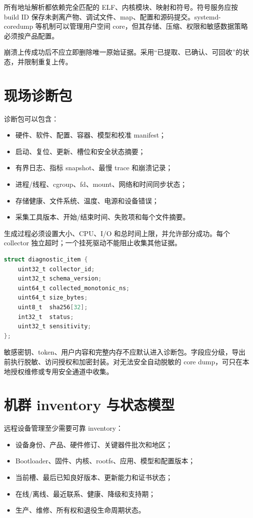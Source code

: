 所有地址解析都依赖完全匹配的 ELF、内核模块、映射和符号。符号服务应按 build ID 保存未剥离产物、调试文件、map、配置和源码提交。systemd-coredump 等机制可以管理用户空间 core，但其存储、压缩、权限和敏感数据策略必须按产品配置\cite{systemd-coredump}。

崩溃上传成功后不应立即删除唯一原始证据。采用“已提取、已确认、可回收”的状态，并限制重复上传。

\section{现场诊断包}

诊断包可以包含：

\begin{itemize}
  \item 硬件、软件、配置、容器、模型和校准 manifest；
  \item 启动、复位、更新、槽位和安全状态摘要；
  \item 有界日志、指标 snapshot、最慢 trace 和崩溃记录；
  \item 进程/线程、cgroup、fd、mount、网络和时间同步状态；
  \item 存储健康、文件系统、温度、电源和设备错误；
  \item 采集工具版本、开始/结束时间、失败项和每个文件摘要。
\end{itemize}

生成过程必须设置大小、CPU、I/O 和总时间上限，并允许部分成功。每个 collector 独立超时；一个挂死驱动不能阻止收集其他证据。

\begin{lstlisting}[language=C,caption={诊断包条目的逻辑清单}]
struct diagnostic_item {
    uint32_t collector_id;
    uint32_t schema_version;
    uint64_t collected_monotonic_ns;
    uint64_t size_bytes;
    uint8_t  sha256[32];
    int32_t  status;
    uint32_t sensitivity;
};
\end{lstlisting}

敏感密钥、token、用户内容和完整内存不应默认进入诊断包。字段应分级，导出前执行脱敏、访问授权和加密封装。对无法安全自动脱敏的 core dump，可只在本地授权维修或专用安全通道中收集。

\section{机群 inventory 与状态模型}

远程设备管理至少需要可靠 inventory：

\begin{itemize}
  \item 设备身份、产品、硬件修订、关键器件批次和地区；
  \item Bootloader、固件、内核、rootfs、应用、模型和配置版本；
  \item 当前槽、最后已知良好版本、更新能力和证书状态；
  \item 在线/离线、最近联系、健康、降级和支持期；
  \item 生产、维修、所有权和退役生命周期状态。
\end{itemize}

